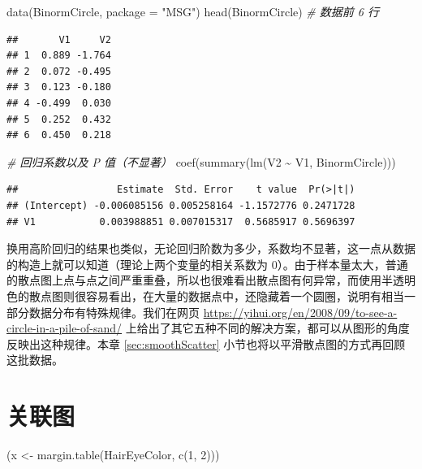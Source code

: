 \documentclass[
  b5paper,
  UTF8,twoside]{book}
\newenvironment{Shaded}{\begin{snugshade}}{\end{snugshade}}
\newcommand{\AttributeTok}[1]{\textcolor[rgb]{0.77,0.63,0.00}{#1}}
\newcommand{\CommentTok}[1]{\textcolor[rgb]{0.56,0.35,0.01}{\textit{#1}}}
\newcommand{\DecValTok}[1]{\textcolor[rgb]{0.00,0.00,0.81}{#1}}
\newcommand{\FunctionTok}[1]{\textcolor[rgb]{0.00,0.00,0.00}{#1}}
\newcommand{\NormalTok}[1]{#1}
\newcommand{\OtherTok}[1]{\textcolor[rgb]{0.56,0.35,0.01}{#1}}
\newcommand{\SpecialCharTok}[1]{\textcolor[rgb]{0.00,0.00,0.00}{#1}}
\newcommand{\StringTok}[1]{\textcolor[rgb]{0.31,0.60,0.02}{#1}}
\begin{document}
\begin{Shaded}
\begin{Highlighting}[]
\FunctionTok{data}\NormalTok{(BinormCircle, }\AttributeTok{package =} \StringTok{"MSG"}\NormalTok{)}
\FunctionTok{head}\NormalTok{(BinormCircle) }\CommentTok{\# 数据前 6 行}
\end{Highlighting}
\end{Shaded}

\begin{verbatim}
##       V1     V2
## 1  0.889 -1.764
## 2  0.072 -0.495
## 3  0.123 -0.180
## 4 -0.499  0.030
## 5  0.252  0.432
## 6  0.450  0.218
\end{verbatim}

\begin{Shaded}
\begin{Highlighting}[]
\CommentTok{\# 回归系数以及 P 值（不显著）}
\FunctionTok{coef}\NormalTok{(}\FunctionTok{summary}\NormalTok{(}\FunctionTok{lm}\NormalTok{(V2 }\SpecialCharTok{\textasciitilde{}}\NormalTok{ V1, BinormCircle)))}
\end{Highlighting}
\end{Shaded}

\begin{verbatim}
##                 Estimate  Std. Error    t value  Pr(>|t|)
## (Intercept) -0.006085156 0.005258164 -1.1572776 0.2471728
## V1           0.003988851 0.007015317  0.5685917 0.5696397
\end{verbatim}

换用高阶回归的结果也类似，无论回归阶数为多少，系数均不显著，这一点从数据的构造上就可以知道（理论上两个变量的相关系数为 0）。由于样本量太大，普通的散点图上点与点之间严重重叠，所以也很难看出散点图有何异常，而使用半透明色的散点图则很容易看出，在大量的数据点中，还隐藏着一个圆圈，说明有相当一部分数据分布有特殊规律。我们在网页 \url{https://yihui.org/en/2008/09/to-see-a-circle-in-a-pile-of-sand/}
上给出了其它五种不同的解决方案，都可以从图形的角度反映出这种规律。本章 \ref{sec:smoothScatter} 小节也将以平滑散点图的方式再回顾这批数据。

\hypertarget{sec:assocplot}{%
\section{关联图}\label{sec:assocplot}}





\begin{Shaded}
\begin{Highlighting}[]
\NormalTok{(x }\OtherTok{\textless{}{-}} \FunctionTok{margin.table}\NormalTok{(HairEyeColor, }\FunctionTok{c}\NormalTok{(}\DecValTok{1}\NormalTok{, }\DecValTok{2}\NormalTok{)))}
\end{Highlighting}
\end{Shaded}
\end{document}

